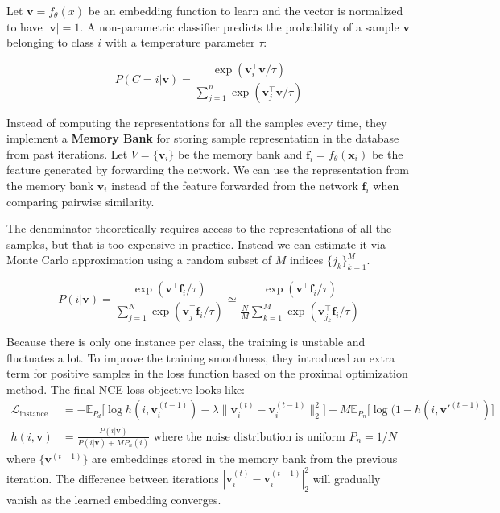 \documentclass[12pt]{article}
\begin{document}
Let $\mathbf{v} = f_\theta(x)$ be an embedding function to learn and the vector is normalized to have $|\mathbf{v}|=1$. A non-parametric classifier predicts the probability of a sample $\mathbf{v}$ belonging to class $i$ with a temperature parameter $\tau$:

\[
P(C=i\vert \mathbf{v}) = \frac{\exp(\mathbf{v}_i^\top \mathbf{v} / \tau)}{\sum_{j=1}^n \exp(\mathbf{v}_j^\top \mathbf{v} / \tau)}
\]

Instead of computing the representations for all the samples every time, they implement a \textbf{Memory Bank} for storing sample representation in the database from past iterations. Let $V=\{ \mathbf{v}_i \}$ be the memory bank and $\mathbf{f}_i = f_\theta(\mathbf{x}_i)$ be the feature generated by forwarding the network. We can use the representation from the memory bank $\mathbf{v}_i$ instead of the feature forwarded from the network $\mathbf{f}_i$ when comparing pairwise similarity.

The denominator theoretically requires access to the representations of all the samples, but that is too expensive in practice. Instead we can estimate it via Monte Carlo approximation using a random subset of $M$ indices $\{j_k\}_{k=1}^M$.

\[
P(i\vert \mathbf{v}) 
= \frac{\exp(\mathbf{v}^\top \mathbf{f}_i / \tau)}{\sum_{j=1}^N \exp(\mathbf{v}_j^\top \mathbf{f}_i / \tau)}
\simeq \frac{\exp(\mathbf{v}^\top \mathbf{f}_i / \tau)}{\frac{N}{M} \sum_{k=1}^M \exp(\mathbf{v}_{j_k}^\top \mathbf{f}_i / \tau)}
\]

Because there is only one instance per class, the training is unstable and fluctuates a lot. To improve the training smoothness, they introduced an extra term for positive samples in the loss function based on the \href{https://web.stanford.edu/~boyd/papers/prox_algs.html}{proximal optimization method}. The final NCE loss objective looks like:
\[
\begin{aligned}
\mathcal{L}_\text{instance} &= - \mathbb{E}_{P_d}\big[\log h(i, \mathbf{v}^{(t-1)}_i) - \lambda \|\mathbf{v}^{(t)}_i - \mathbf{v}^{(t-1)}_i\|^2_2\big] - M\mathbb{E}_{P_n}\big[\log(1 - h(i, \mathbf{v}'^{(t-1)})\big] \\
h(i, \mathbf{v}) &= \frac{P(i\vert\mathbf{v})}{P(i\vert\mathbf{v}) + MP_n(i)} \text{ where the noise distribution is uniform }P_n = 1/N
\end{aligned}
\]
where $\{ \mathbf{v}^{(t-1)} \}$ are embeddings stored in the memory bank from the previous iteration. The difference between iterations $|\mathbf{v}^{(t)}_i - \mathbf{v}^{(t-1)}_i|^2_2$ will gradually vanish as the learned embedding converges.
\end{document}
